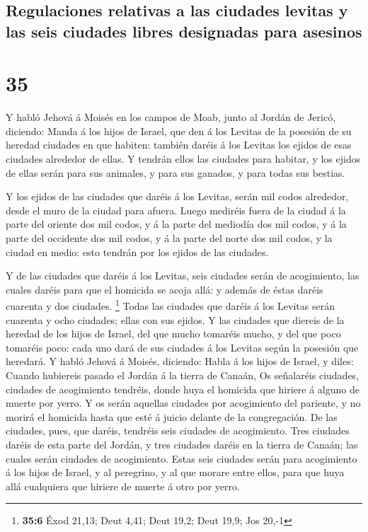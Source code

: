 \hypertarget{regulaciones-relativas-a-las-ciudades-levitas-y-las-seis-ciudades-libres-designadas-para-asesinos}{%
\subsection{Regulaciones relativas a las ciudades levitas y las seis
ciudades libres designadas para
asesinos}\label{regulaciones-relativas-a-las-ciudades-levitas-y-las-seis-ciudades-libres-designadas-para-asesinos}}

\hypertarget{section-34}{%
\section{35}\label{section-34}}

 Y habló Jehová á Moisés en los campos de Moab, junto al
Jordán de Jericó, diciendo:  Manda á los hijos de Israel,
que den á los Levitas de la posesión de su heredad ciudades en que
habiten: también daréis á los Levitas los ejidos de esas ciudades
alrededor de ellas.  Y tendrán ellos las ciudades para
habitar, y los ejidos de ellas serán para sus animales, y para sus
ganados, y para todas sus bestias.

 Y los ejidos de las ciudades que daréis á los Levitas,
serán mil codos alrededor, desde el muro de la ciudad para afuera.
 Luego mediréis fuera de la ciudad á la parte del oriente
dos mil codos, y á la parte del mediodía dos mil codos, y á la parte del
occidente dos mil codos, y á la parte del norte dos mil codos, y la
ciudad en medio: esto tendrán por los ejidos de las ciudades.

 Y de las ciudades que daréis á los Levitas, seis ciudades
serán de acogimiento, las cuales daréis para que el homicida se acoja
allá: y además de éstas daréis cuarenta y dos ciudades. \footnote{\textbf{35:6}
  Éxod 21,13; Deut 4,41; Deut 19,2; Deut 19,9; Jos 20,-1} 
Todas las ciudades que daréis á los Levitas serán cuarenta y ocho
ciudades; ellas con sus ejidos.  Y las ciudades que
diereis de la heredad de los hijos de Israel, del que mucho tomaréis
mucho, y del que poco tomaréis poco: cada uno dará de sus ciudades á los
Levitas según la posesión que heredará.  Y habló Jehová á
Moisés, diciendo:  Habla á los hijos de Israel, y diles:
Cuando hubiereis pasado el Jordán á la tierra de Canaán, 
Os señalaréis ciudades, ciudades de acogimiento tendréis, donde huya el
homicida que hiriere á alguno de muerte por yerro.  Y os
serán aquellas ciudades por acogimiento del pariente, y no morirá el
homicida hasta que esté á juicio delante de la congregación.
 De las ciudades, pues, que daréis, tendréis seis
ciudades de acogimiento.  Tres ciudades daréis de esta
parte del Jordán, y tres ciudades daréis en la tierra de Canaán; las
cuales serán ciudades de acogimiento.  Estas seis
ciudades serán para acogimiento á los hijos de Israel, y al peregrino, y
al que morare entre ellos, para que huya allá cualquiera que hiriere de
muerte á otro por yerro.

